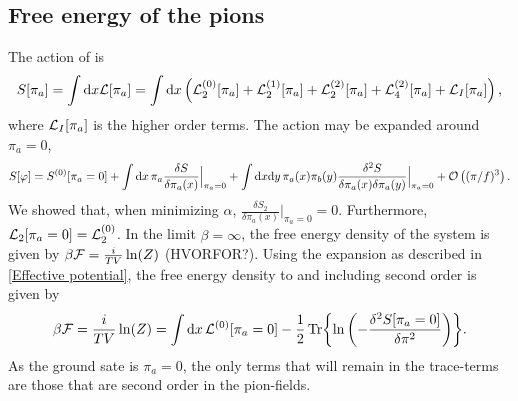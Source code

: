 \subsection{Free energy of the pions}
The action of \chpt is 
\begin{equation}
    S[\pi_a] =\int \dd x \Ell[\pi_a]
    = 
    \int \dd x \left(
        \Ell^{(0)}_2[\pi_a] +\Ell^{(1)}_2[\pi_a] + \Ell^{(2)}_2[\pi_a] + \Ell^{(2)}_4[\pi_a] 
        + \Ell_I[\pi_a] 
        \right),
\end{equation}
where $\Ell_I[\pi_a] $ is the higher order terms.
The action may be expanded around $\pi_a = 0$,
\begin{equation}
    S[\varphi]
    = 
    S^{(0)}[\pi_a = 0] 
    + \int \dd x \, \pi_a  \frac{\delta S}{\delta \pi_a(x)}\Big|_{\pi_a=0}
    + \int \dd x \dd y \, \pi_a(x) \pi_b(y)
    \frac{\delta^2 S}{\delta \pi_a(x) \delta \pi_a(y)}\Big|_{\pi_a=0}
    + \Oh[3]{(\pi/f)}.
\end{equation}
We showed that, when minimizing $\alpha$, $\frac{\delta S_2}{\delta \pi_a(x)}\Big|_{\pi_a=0} = 0$. 
Furthermore, $\Ell_2[\pi_a = 0] = \Ell_2^{(0)}$. 
In the limit $\beta = \infty$, the free energy density of the system is given by $ \beta \Ef
= \frac{i}{T V} \ln(Z)$ (HVORFOR?). 
Using the expansion as described in \autoref{Effective potential}, the free energy density to and including second order is given by 
\begin{equation}
    \beta \Ef
    = \frac{i}{T V} \ln(Z)
    = \int \dd x\, \Ell^{(0)}[\pi_a = 0]
    - \frac{1}{2} \Tr{\ln\left( - \frac{\delta^2 S[\pi_a=0]}{\delta \pi^2} \right)}.
\end{equation}
As the ground sate is $\pi_a = 0$, the only terms that will remain in the trace-terms are those that are second order in the pion-fields.
